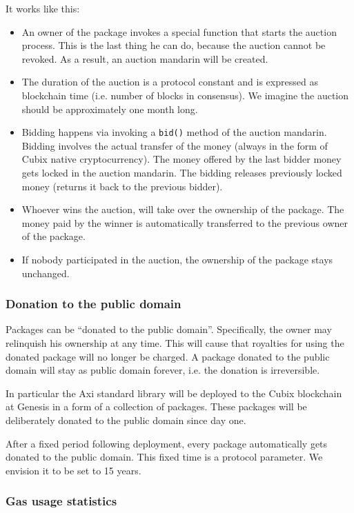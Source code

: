 \documentclass[a4paper]{article}
\newcommand{\code}[1]{{\small \texttt{#1}}}
\begin{document}
It works like this:

\begin{itemize}
  \item An owner of the package invokes a special function that starts the auction process. This is the last thing he can do, because the auction cannot be revoked. As a result, an auction mandarin will be created.
  \item The duration of the auction is a protocol constant and is expressed as blockchain time (i.e. number of blocks in consensus). We imagine the auction should be approximately one month long.
  \item Bidding happens via invoking a \code{bid()} method of the auction mandarin. Bidding involves the actual transfer of the money (always in the form of Cubix native cryptocurrency). The money offered by the last bidder money gets locked in the auction mandarin. The bidding releases previously locked money (returns it back to the previous bidder).
  \item Whoever wins the auction, will take over the ownership of the package. The money paid by the winner is automatically transferred to the previous owner of the package.
  \item If nobody participated in the auction, the ownership of the package stays unchanged.
\end{itemize}

\subsubsection{Donation to the public domain}

Packages can be ``donated to the public domain''. Specifically, the owner may relinquish his ownership at any time. This will cause that royalties for using the donated package will no longer be charged. A package donated to the public domain will stay as public domain forever, i.e. the donation is irreversible.

In particular the Axi standard library will be deployed to the Cubix blockchain at Genesis in a form of a collection of packages. These packages will be deliberately donated to the public domain since day one.

After a fixed period following deployment, every package automatically gets donated to the public domain. This fixed time is a protocol parameter. We envision it to be set to 15 years.

\subsubsection{Gas usage statistics}
\end{document}
